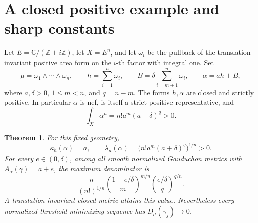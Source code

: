 \documentclass[11pt]{article}
\newtheorem{theorem}{Theorem}
\begin{document}
\section{A closed positive example and sharp constants}

Let \(E=\mathbb C/(\mathbb Z+i\mathbb Z)\), let \(X=E^n\), and let
\(\omega_i\) be the pullback of the translation-invariant positive
area form on the \(i\)-th factor with integral one. Set
\[
 \mu=\omega_1\wedge\cdots\wedge\omega_n,\qquad
 h=\sum_{i=1}^n\omega_i,\qquad
 B=\delta\sum_{i=m+1}^n\omega_i,\qquad
 \alpha=a h+B,
\]
where \(a,\delta>0\), \(1\leq m<n\), and \(q=n-m\).
The forms \(h,\alpha\) are closed and strictly positive. In particular
\(\alpha\) is nef, is itself a strict positive representative, and
\[
 \int_X\alpha^n=n!a^m(a+\delta)^q>0.
\]

\begin{theorem}\label{thm:flat}
For this fixed geometry,
\[
 \kappa_h(\alpha)=a,\qquad
 \lambda_\mu(\alpha)=\bigl(n!a^m(a+\delta)^q\bigr)^{1/n}>0.
\]
For every \(e\in(0,\delta)\), among all smooth normalized Gauduchon
metrics with \(A_\alpha(\gamma)=a+e\), the maximum denominator is
\begin{equation}\label{eq:flat}
 \frac{n}{(n!)^{1/n}}
 \left(\frac{1-e/\delta}{m}\right)^{m/n}
 \left(\frac{e/\delta}{q}\right)^{q/n}.
\end{equation}
A translation-invariant closed metric attains this value.
Nevertheless every normalized threshold-minimizing sequence has
\(D_\mu(\gamma_j)\to0\).
\end{theorem}
\end{document}
